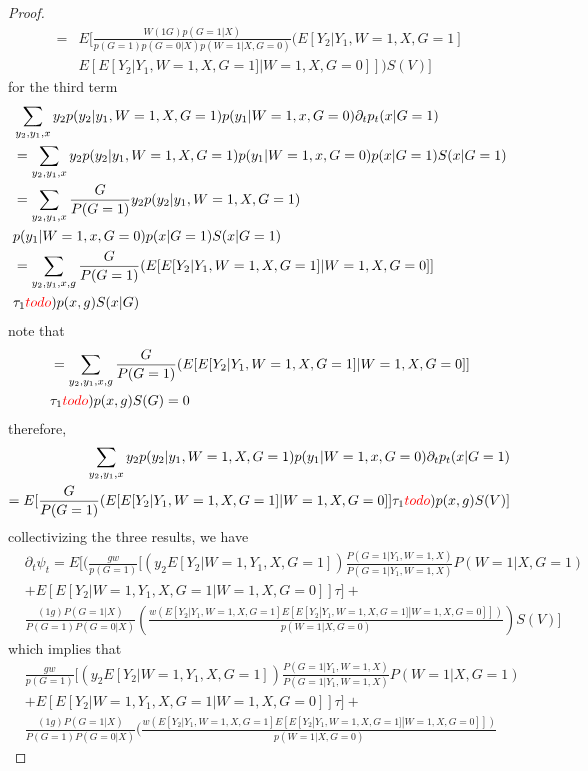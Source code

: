 \documentclass{article}
\begin{document}
\begin{proof}
\begin{align*}
= &E [  \frac{  W ( 1 G)   p(G =1 | X) }{ p(G=1) p ( G= 0 | X)  p ( W = 1 | X ,G =0) } (E [ Y_2 |   Y_1 ,W = 1, X, G =1 ] \\
&E [ E[ Y_2 | Y_1 , W =1 , X, G =1 ] | W=1, X, G= 0 ]] )  S(  V) ] 
\end{align*}
for the third term
\begin{align*}
&\sum_ { y_2 ,y_1,x} y_2  p ( y_2| y_1 , W= 1, X , G= 1) p ( y_1 | W =1 , x, G= 0 ) \partial_t p_t( x | G =1 )\\
&= \sum_ { y_2 ,y_1,x} y_2  p ( y_2| y_1 , W= 1, X , G= 1) p ( y_1 | W =1 , x, G= 0 ) p( x | G =1 ) S( x | G= 1) \\
&= \sum_ { y_2 , y_1, x}      \frac{ G } { P(G =1 ) }   y_2  p ( y_2| y_1 , W= 1, X , G= 1)\\
&p ( y_1 | W =1 , x, G= 0 ) p( x | G =1 ) S( x | G= 1) \\
&= \sum_ { y_2 , y_1, x, g}      \frac{ G } { P(G =1 ) }   (E[ E[Y_2| Y_1,  W =1, X, G = 1 ] | W =1 , X, G = 0 ]]   \\
&\tau_1 {\color{red}todo}) p( x , g ) S( x | G)
\end{align*}
note that
\begin{align*}
&= \sum_ { y_2 , y_1, x, g}      \frac{ G } { P(G =1 ) }   (E[ E[Y_2| Y_1,  W =1, X, G = 1 ] | W =1 , X, G = 0 ]]   \\
&\tau_1 {\color{red}todo}) p( x , g ) S(  G) = 0
\end{align*}
therefore,
\begin{align*}
\sum_ { y_2 ,y_1,x} y_2  p ( y_2| y_1 , W= 1, X , G= 1) p ( y_1 | W =1 , x, G= 0 ) \partial_t p_t( x | G =1 )\\
= E[      \frac{ G } { P(G =1 ) }   (E[ E[Y_2| Y_1,  W =1, X, G = 1 ] | W =1 , X, G = 0 ]]   \tau_1 {\color{red}todo}) p( x , g ) S(  V) ]
\end{align*}
collectivizing the three results, we have
\begin{align*}
&\partial_t \psi_t = E [  (\frac{ g w }{ p(G=1) } [ (y_2  E[ Y_2 | W=1 , Y_1 , X, G =1]  ) \frac{ P( G =1 | Y_1 , W=1 , X ) }{ P(G=1 | Y_1 , W=1 , X ) } P( W=1 |X ,G=1) \\
& + E [ E[ Y_2 | W = 1, Y_1 , X, G =1 | W =1, X, G= 0 ] ]  \tau    ]  + \\
&\frac{ (1 g) P(G = 1|X)   }{ P(G= 1) P ( G =0 |X) } ( \frac{ w ( E [ Y _ 2 | Y_1,W =1 , X, G =1 ]  E [ E[ Y_2 | Y_1, W=1, X, G=1 ] | W =1, X, G= 0 ] ] ) }{ p ( W =1| X, G =0 ) } )S(V) ] 
\end{align*}
which implies that
\begin{align*}
&\frac{ g w }{ p(G=1) } [ (y_2  E[ Y_2 | W=1 , Y_1 , X, G =1]  ) \frac{ P( G =1 | Y_1 , W=1 , X ) }{ P(G=1 | Y_1 , W=1 , X ) } P( W=1 | X , G=1) \\
&+ E [ E[ Y_2 | W= 1,Y_1 , X, G =1 | W =1, X, G= 0 ] ]  \tau    ]  + \\
&\frac{ (1 g) P(G = 1|X)   }{ P(G= 1) P ( G =0 |X) } ( \frac{ w ( E [ Y _ 2 | Y_1,W =1 , X, G =1 ]  E [ E[ Y_2 | Y_1, W=1, X, G=1 ] | W =1, X, G= 0 ] ] ) }{ p (W =1| X, G =0 ) }
\end{align*}

\end{proof}
\end{document}
